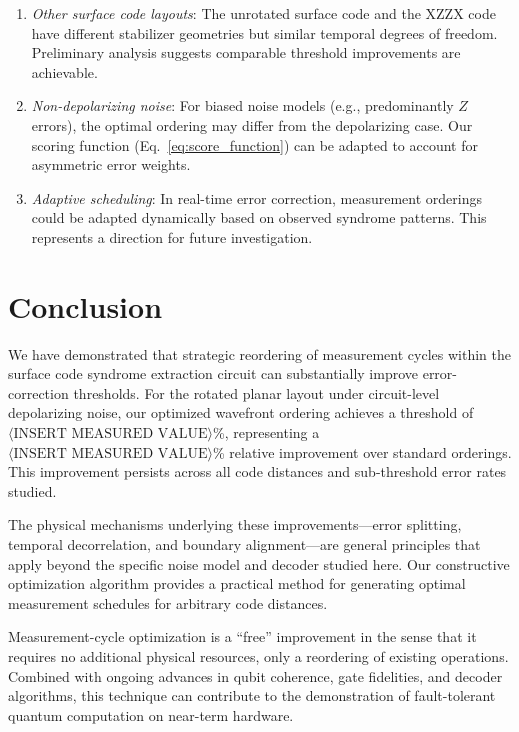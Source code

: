 \documentclass[
    reprint,
    aps,
    prx,
    superscriptaddress,
    longbibliography
]{revtex4-2}
\begin{document}
\begin{enumerate}[label=(\roman*)]
    \item \emph{Other surface code layouts}: The unrotated surface code and the XZZX code~\cite{Bonilla2021XZZX} have different stabilizer geometries but similar temporal degrees of freedom. Preliminary analysis suggests comparable threshold improvements are achievable.
    \item \emph{Non-depolarizing noise}: For biased noise models (e.g., predominantly $Z$ errors), the optimal ordering may differ from the depolarizing case. Our scoring function (Eq.~\ref{eq:score_function}) can be adapted to account for asymmetric error weights.
    \item \emph{Adaptive scheduling}: In real-time error correction, measurement orderings could be adapted dynamically based on observed syndrome patterns. This represents a direction for future investigation.
\end{enumerate}

\section{Conclusion}
\label{sec:conclusion}

We have demonstrated that strategic reordering of measurement cycles within the surface code syndrome extraction circuit can substantially improve error-correction thresholds. For the rotated planar layout under circuit-level depolarizing noise, our optimized wavefront ordering achieves a threshold of $\langle\text{INSERT MEASURED VALUE}\rangle$\%, representing a $\langle\text{INSERT MEASURED VALUE}\rangle$\% relative improvement over standard orderings. This improvement persists across all code distances and sub-threshold error rates studied.

The physical mechanisms underlying these improvements---error splitting, temporal decorrelation, and boundary alignment---are general principles that apply beyond the specific noise model and decoder studied here. Our constructive optimization algorithm provides a practical method for generating optimal measurement schedules for arbitrary code distances.

Measurement-cycle optimization is a ``free'' improvement in the sense that it requires no additional physical resources, only a reordering of existing operations. Combined with ongoing advances in qubit coherence, gate fidelities, and decoder algorithms, this technique can contribute to the demonstration of fault-tolerant quantum computation on near-term hardware.
\end{document}
